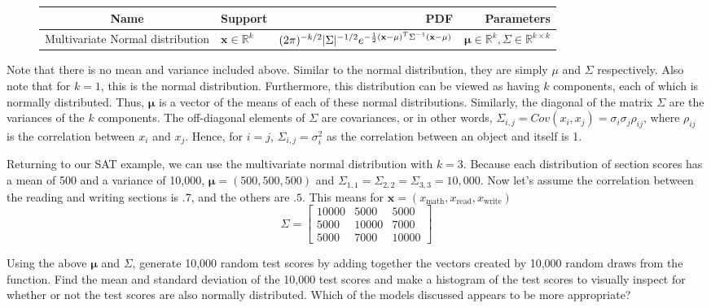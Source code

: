 \begin{figure}[h]
\begin{center}
\begin{tabular}{|c|l|r|r|}
	\hline
Name & Support &  PDF & Parameters \\
\hline
Multivariate Normal distribution  & $\mathbf{x} \in \mathbb{R}^k$ & $(2\pi)^{-k/2}|\Sigma|^{-1/2}e^{-\frac{1}{2}(\mathbf{x} - \mathbf\mathbf{\mu})^T \Sigma^{-1} (\mathbf{x}-\mathbf{\mu})}$ & $\mathbf{\mu}\in \mathbb{R}^k, \Sigma \in \mathbb{R}^{k\times k}$ \\
\hline
\end{tabular}
\end{center}
\end{figure}
Note that there is no mean and variance included above. 
Similar to the normal distribution, they are simply $\mu$ and $\Sigma$ respectively. Also note that for $k=1$, this is the normal distribution.  
Furthermore, this distribution can be viewed as having $k$ components, each of which is normally distributed. 
Thus, $\mathbf{\mu}$ is a vector of the means of each of these normal distributions. 
Similarly, the diagonal of the matrix $\Sigma$ are the variances of the $k$ components. 
The off-diagonal elements of $\Sigma$ are covariances, or in other words, $\Sigma_{i,j} = Cov(x_i,x_j) = \sigma_i \sigma_j \rho_{ij}$, where $\rho_{ij}$ is the correlation between $x_i$ and $x_j$. 
Hence, for $i=j$, $\Sigma_{i,j} = \sigma^2_i$ as the correlation between an object and itself is 1. 

Returning to our SAT example, we can use the multivariate normal distribution with $k=3$. 
Because each distribution of section scores has a mean of 500 and a variance of 10,000, $\mathbf{\mu} = (500,500,500)$ and $\Sigma_{1,1} = \Sigma_{2,2} = \Sigma_{3,3} = 10,000$. 
Now let's assume the correlation between the reading and writing sections is $.7$, and the others are $.5$. 
This means for $\mathbf{x} = (x_{\text{math}},x_{\text{read}},x_{\text{write}})$
\[ \Sigma =  \begin{bmatrix*}
10000 & 5000 & 5000 \\
5000 & 10000 & 7000 \\
5000 & 7000 & 10000 \end{bmatrix*} \]  

\begin{problem}
Using the above $\mathbf{\mu}$ and $\Sigma$, generate 10,000 random test scores by adding together the vectors created by 10,000 random draws from the 
 function. 
Find the mean and standard deviation of the 10,000 test scores and make a histogram of the test scores to visually 
inspect for whether or not the test scores are also normally distributed. 
Which of the models discussed appears to be more appropriate?
\end{problem}


